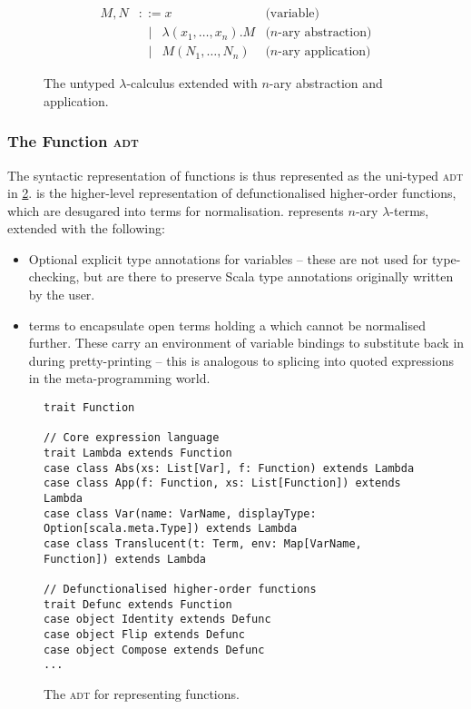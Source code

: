 \documentclass[../../main.tex]{subfiles}
\begin{document}
\begin{figure}
\begin{align*}
M, N &\mathrel{::=} x & \text{(variable)} \\
&\mathrel{\enspace\mid\enspace} \lambda(x_1, \ldots, x_n).M & \text{($n$-ary abstraction)} \\
&\mathrel{\enspace\mid\enspace} M(N_1, \ldots, N_n) & \text{($n$-ary application)}
\end{align*}
\caption{The untyped $\lambda$-calculus extended with $n$-ary abstraction and application.}
\label{fig:lambda-calculus}
\end{figure}

\subsubsection{The Function \textsc{adt}}
The syntactic representation of functions is thus represented as the uni-typed  \textsc{adt} in \cref{fig:function-adt}.
 is the higher-level representation of defunctionalised higher-order functions, which are desugared into  terms for normalisation.
 represents $n$-ary $\lambda$-terms, extended with the following:
\begin{itemize}
  \item Optional explicit type annotations for variables -- these are not used for type-checking, but are there to preserve Scala type annotations originally written by the user.
  \item {} terms to encapsulate open terms holding a  which cannot be normalised further. These carry an environment of variable bindings to substitute back in during pretty-printing -- this is analogous to splicing into quoted expressions in the meta-programming world.
\end{itemize}

\begin{figure}
\begin{verbatim}
trait Function

// Core expression language
trait Lambda extends Function
case class Abs(xs: List[Var], f: Function) extends Lambda
case class App(f: Function, xs: List[Function]) extends Lambda
case class Var(name: VarName, displayType: Option[scala.meta.Type]) extends Lambda
case class Translucent(t: Term, env: Map[VarName, Function]) extends Lambda

// Defunctionalised higher-order functions
trait Defunc extends Function
case object Identity extends Defunc
case object Flip extends Defunc
case object Compose extends Defunc
...
\end{verbatim}
\caption{The  \textsc{adt} for representing functions.}
\label{fig:function-adt}
\end{figure}
\end{document}

